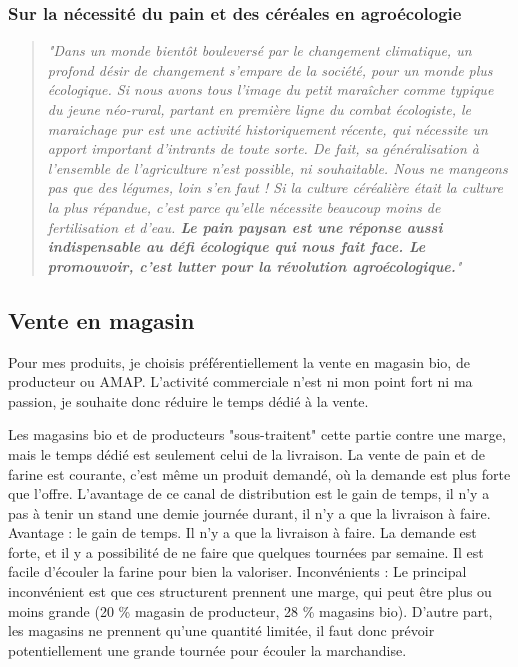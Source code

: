 \documentclass{book}
\begin{document}
\subsubsection{Sur la nécessité du pain et des céréales en agroécologie}

\begin{quote}

\textit{"Dans un monde bientôt bouleversé par le changement climatique, un profond désir de changement s’empare de la société, pour un monde plus écologique. Si nous avons tous l’image du petit maraîcher comme typique du jeune néo-rural, partant en première ligne du combat écologiste, le maraichage pur est une activité historiquement récente, qui nécessite un apport important d’intrants de toute sorte. De fait, sa généralisation à l’ensemble de l’agriculture n’est possible, ni souhaitable. Nous ne mangeons pas que des légumes, loin s’en faut ! Si la culture céréalière était la culture la plus répandue, c’est parce qu’elle nécessite beaucoup moins de fertilisation et d’eau. \textbf{Le pain paysan est une réponse aussi indispensable au défi écologique qui nous fait face. Le promouvoir, c'est lutter pour la révolution agroécologique.}"}

\end{quote}

\subsection{Vente en magasin}

Pour mes produits, je choisis préférentiellement la vente en magasin bio, de producteur ou AMAP. L’activité commerciale n’est ni mon point fort ni ma passion, je souhaite donc réduire le temps dédié à la vente. 

Les magasins bio et de producteurs "sous-traitent" cette partie contre une marge, mais le temps dédié est seulement celui de la livraison. La vente de pain et de farine est courante, c’est même un produit demandé, où la demande est plus forte que l’offre. L’avantage de ce canal de distribution est le gain de temps, il n’y a pas à tenir un stand une demie journée durant, il n’y a que la livraison à faire. 
Avantage : le gain de temps. Il n’y a que la livraison à faire. La demande est forte, et il y a possibilité de ne faire que quelques tournées par semaine. Il est facile d’écouler la farine pour bien la valoriser. 
Inconvénients : Le principal inconvénient est que ces structurent prennent une marge, qui peut être plus ou moins grande (20 \% magasin de producteur, 28 \% magasins bio). D’autre part, les magasins ne prennent qu’une quantité limitée, il faut donc prévoir potentiellement une grande tournée pour écouler la marchandise.
\end{document}
